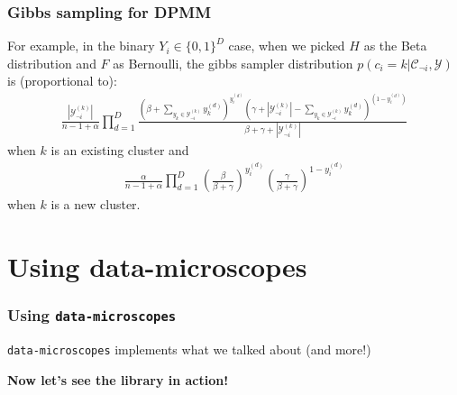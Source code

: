 \documentclass{beamer}
\newcommand{\Y}{\ensuremath{\mathcal{Y}}}
\newcommand{\C}{\ensuremath{\mathcal{C}}}
\begin{document}
\begin{frame}
\frametitle{Gibbs sampling for DPMM}
For example, in the binary $Y_i \in \{0,1\}^{D}$ case, when we picked $H$ as
the Beta distribution and $F$ as Bernoulli, the gibbs sampler distribution
$p(c_i{=}k | \C_{\neg i}, \Y)$
is (proportional to): \pause
\begin{align*}
  \frac{ |\Y^{(k)}_{\neg i}| }{ n - 1 + \alpha } \prod_{d=1}^{D} \frac{\left(\beta+\sum_{y_k\in \Y^{(k)}_{\neg i}} y_k^{(d)}\right)^{y_i^{(d)}} \left(  \gamma + |\Y^{(k)}_{\neg i}| - \sum_{y_k\in \Y^{(k)}_{\neg i}} y_k^{(d)}\right)^{(1-y_i^{(d)})} }{ \beta + \gamma + |\Y^{(k)}_{\neg i}| }
\end{align*}
when $k$ is an existing cluster and 
\begin{align*}
  \frac{ \alpha }{ n - 1 + \alpha } \prod_{d=1}^{D} \left(\frac{\beta}{\beta+\gamma}\right)^{y_i^{(d)}} \left(\frac{\gamma}{\beta+\gamma}\right)^{1-y_i^{(d)}}
\end{align*}
when $k$ is a new cluster.
\end{frame}


\section{Using data-microscopes}

\begin{frame}
\frametitle{Using \texttt{data-microscopes}}
\texttt{data-microscopes} implements what we talked about (and more!) 
\newline
\newline
\pause

\textbf{Now let's see the library in action!}
\end{frame}

%
%
\end{document}
